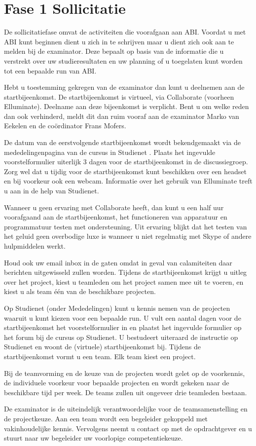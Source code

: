 \section{Fase 1 Sollicitatie}
De sollicitatiefase omvat de activiteiten die voorafgaan aan ABI.
Voordat u met ABI kunt beginnen dient u zich in te schrijven maar
u dient zich ook aan te melden bij de examinator. Deze bepaalt op
basis van de informatie die u verstrekt over uw studieresultaten
en uw planning of u toegelaten kunt worden tot een bepaalde run
van ABI.

Hebt u toestemming gekregen van de examinator dan kunt u
deelnemen aan de startbijeenkomst. De startbijeenkomst is virtueel,
via Collaborate (voorheen Elluminate). Deelname aan deze bijeenkomst
is verplicht. Bent u om welke reden dan ook
verhinderd, meldt dit dan ruim vooraf aan de examinator Marko
van Eekelen en de co\"{o}rdinator Frans Mofers.

De datum van de eerstvolgende startbijeenkomst wordt bekendgemaakt
via de mededelingenpagina van de cursus in Studienet . Plaats het
ingevulde voorstelformulier uiterlijk 3 dagen voor de startbijeenkomst
in de discussiegroep. Zorg wel dat u tijdig voor de startbijeenkomst
kunt beschikken over een headset en bij voorkeur ook een webcam.
Informatie over het gebruik van Elluminate treft u aan in de help van Studienet.

Wanneer u geen ervaring met Collaborate heeft, dan kunt u een half uur
voorafgaand aan de startbijeenkomst, het functioneren van apparatuur
en programmatuur testen met ondersteuning. Uit ervaring blijkt dat het
testen van het geluid geen overbodige luxe is wanneer u niet regelmatig
met Skype of andere hulpmiddelen werkt.

Houd ook uw email inbox in de gaten omdat in geval van calamiteiten
daar berichten uitgewisseld zullen worden. Tijdens de startbijeenkomst
krijgt u uitleg over het project, kiest u teamleden om het project samen
mee uit te voeren, en kiest u als team \'e\'en van de beschikbare projecten.

Op Studienet (onder Mededelingen) kunt u kennis nemen van de projecten
waaruit u kunt kiezen voor een bepaalde run. U vult een aantal dagen
voor de startbijeenkomst het voorstelformulier in en plaatst het
ingevulde formulier op het forum bij de cursus op Studienet.
U bestudeert uiteraard de instructie op Studienet en woont de (virtuele)
startbijeenkomst bij. Tijdens de startbijeenkomst vormt u een team.
Elk team kiest een project.

Bij de teamvorming en de keuze van de projecten wordt gelet op de
voorkennis, de individuele voorkeur voor bepaalde projecten en wordt
gekeken naar de beschikbare tijd per week. De teams zullen uit ongeveer
drie teamleden bestaan.

De examinator is de uiteindelijk verantwoordelijke voor de
teamsamenstelling en de projectkeuze. Aan een team wordt een
begeleider gekoppeld met vakinhoudelijke kennis. Vervolgens neemt u
contact op met de opdrachtgever en u stuurt naar uw begeleider
uw voorlopige competentiekeuze.

